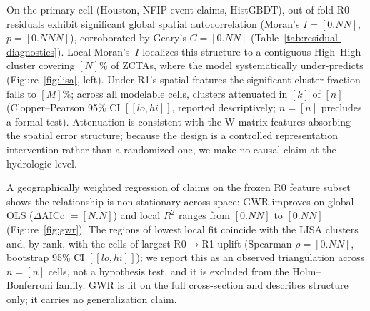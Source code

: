 On the primary cell (Houston, NFIP event claims, HistGBDT), out-of-fold R0
residuals exhibit significant global spatial autocorrelation
(Moran's $I = [0.NN]$, %
$p = [0.NNN]$),
corroborated by Geary's $C = [0.NN]$
(Table~\ref{tab:residual-diagnostics}). Local Moran's~$I$ localizes this
structure to a contiguous High--High cluster covering $[N]\%$
of ZCTAs, where the model systematically under-predicts
(Figure~\ref{fig:lisa}, left). Under R1's spatial features the
significant-cluster fraction falls to $[M]\%$;
across all modelable cells, clusters attenuated in $[k]$ of $[n]$
(Clopper--Pearson 95\% CI $[[lo, hi]]$,
reported descriptively; $n{=}[n]$ precludes a formal test). Attenuation is
consistent with the W-matrix features absorbing the spatial error structure;
because the design is a controlled representation intervention rather than a
randomized one, we make no causal claim at the hydrologic level.

A geographically weighted regression of claims on the frozen R0 feature subset
shows the relationship is non-stationary across space: GWR improves on global
OLS ($\Delta$AICc $= [N.N]$)
and local $R^2$ ranges from $[0.NN]$ to $[0.NN]$
(Figure~\ref{fig:gwr}). The regions of lowest local fit coincide with the LISA
clusters and, by rank, with the cells of largest R0$\rightarrow$R1 uplift
(Spearman $\rho = [0.NN]$, bootstrap 95\% CI $[[lo, hi]]$);
we report this as an observed triangulation across $n{=}[n]$ cells, not a
hypothesis test, and it is excluded from the Holm--Bonferroni family. GWR is fit
on the full cross-section and describes structure only; it carries no
generalization claim.

